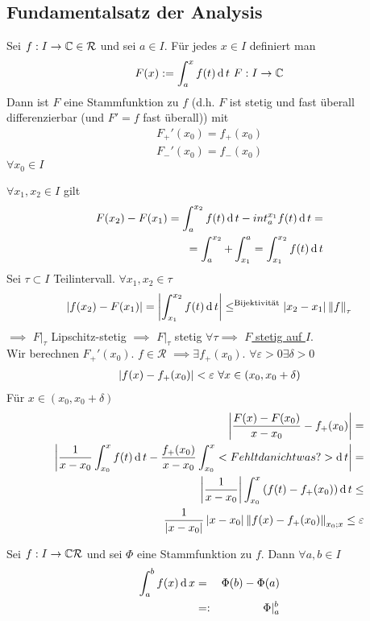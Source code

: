 \subsection{Fundamentalsatz der Analysis}
\begin{Sat}
  Sei $f:I\to\mathbb{C}\in\mathcal{R}$ und sei $a\in I$. Für jedes $x\in I$ definiert man
  \[F(x):=\int_a^x f(t)\md t\ F:I\to\mb{C}\]
  Dann ist $F$ eine Stammfunktion zu $f$ (d.h. $F$ ist stetig und fast überall differenzierbar (und $F'=f$ fast überall)) mit
  \begin{align*}
    F_+'(x_0)=f_+(x_0)\\
    F_-'(x_0)=f_-(x_0)
  \end{align*}
  $\forall x_0 \in I$
\end{Sat}
\begin{Bew}
  $\forall x_1,x_2\in I$ gilt
  \begin{align*}
    F(x_2)-F(x_1)=\int_a^{x_2}f(t)\operatorname{d} t-int^{x_1}_a f(t)\operatorname{d} t =\\
    =\int^{x_2}_a+\int^a_{x_1}= \int^{x_2}_{x_1}f(t)\operatorname{d} t    
  \end{align*}
  Sei $\tau\subset I$ Teilintervall. $\forall x_1, x_2\in \tau$
  \begin{align*}
    \left| f(x_2)-F(x_1) \right|=\left| \int^{x_2}_{x_1}f(t)\operatorname{d} t \right|\leq^{\text{Bijektivität}} \left| x_2-x_1 \right|\left\| f \right\|_\tau
  \end{align*}
  $\implies$ $F|_\tau$ Lipschitz-stetig $\implies$ $F|_\tau$ stetig $\forall \tau \implies$ \underline{$F$ stetig auf $I$}.\\
  Wir berechnen $F_+'(x_0)$. $f\in\mathcal{R}$ $\implies \exists f_+(x_0)$. $\forall \varepsilon>0 \exists \delta >0$
  \begin{align*}
    \left| f(x)-f_+(x_0) \right|<\varepsilon\ \forall x\in(x_0, x_0+\delta)\\
  \end{align*}
  Für $x\in (x_0, x_0+\delta)$
  \begin{align*}
    \left|  \frac{F(x)-F(x_0)}{x-x_0} -f_+(x_0)  \right| = \\ \left|  \frac{1}{x-x_0} \int_{x_0}^x f(t)\operatorname{d} t-\frac{f_+(x_0)}{x-x_0} \int_{x_0}^x <Fehlt da nicht was?> \operatorname{d} t \right| = \\
    \left| \frac{1}{x-x_0} \right|\int_{x_0}^x\left( f(t)-f_+(x_0) \right)\operatorname{d} t \leq\\
    \frac{1}{\left| x-x_0 \right|}\left| x-x_0 \right|\left\| f(x)-f_+(x_0) \right\|_{x_0;x} \leq \varepsilon
  \end{align*}
\end{Bew}
\begin{Kor}
  Sei $f:I\to\mathbb{C}\mathcal{R}$ und sei $\Phi$ eine Stammfunktion zu $f$. Dann $\forall a,b\in I$
  \begin{align*}
    \int^b_af(x)\operatorname{d} x&=&\Phi(b)-\Phi(a)\\
    &=:&\Phi|^b_a
  \end{align*}
\end{Kor}
